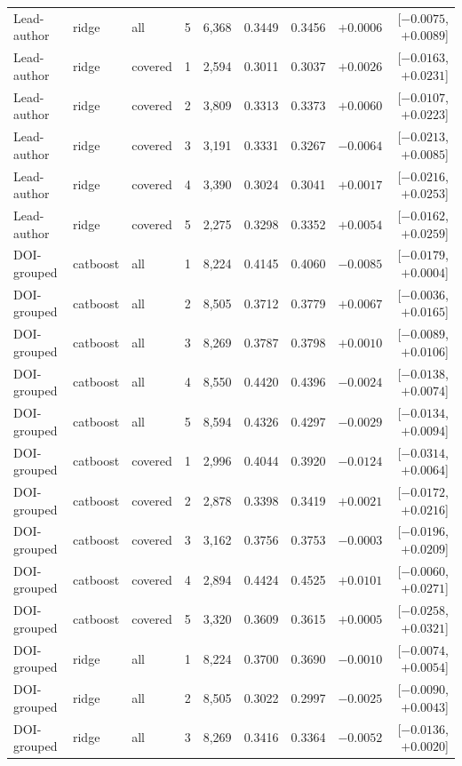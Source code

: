 \documentclass[10pt]{article}
\begin{document}
{\begin{longtable}{llllrrrrr}
Lead-author & ridge & all & 5 & 6,368 & 0.3449 & 0.3456 & $+0.0006$ & [$-0.0075$, $+0.0089$]\\
Lead-author & ridge & covered & 1 & 2,594 & 0.3011 & 0.3037 & $+0.0026$ & [$-0.0163$, $+0.0231$]\\
Lead-author & ridge & covered & 2 & 3,809 & 0.3313 & 0.3373 & $+0.0060$ & [$-0.0107$, $+0.0223$]\\
Lead-author & ridge & covered & 3 & 3,191 & 0.3331 & 0.3267 & $-0.0064$ & [$-0.0213$, $+0.0085$]\\
Lead-author & ridge & covered & 4 & 3,390 & 0.3024 & 0.3041 & $+0.0017$ & [$-0.0216$, $+0.0253$]\\
Lead-author & ridge & covered & 5 & 2,275 & 0.3298 & 0.3352 & $+0.0054$ & [$-0.0162$, $+0.0259$]\\
DOI-grouped & catboost & all & 1 & 8,224 & 0.4145 & 0.4060 & $-0.0085$ & [$-0.0179$, $+0.0004$]\\
DOI-grouped & catboost & all & 2 & 8,505 & 0.3712 & 0.3779 & $+0.0067$ & [$-0.0036$, $+0.0165$]\\
DOI-grouped & catboost & all & 3 & 8,269 & 0.3787 & 0.3798 & $+0.0010$ & [$-0.0089$, $+0.0106$]\\
DOI-grouped & catboost & all & 4 & 8,550 & 0.4420 & 0.4396 & $-0.0024$ & [$-0.0138$, $+0.0074$]\\
DOI-grouped & catboost & all & 5 & 8,594 & 0.4326 & 0.4297 & $-0.0029$ & [$-0.0134$, $+0.0094$]\\
DOI-grouped & catboost & covered & 1 & 2,996 & 0.4044 & 0.3920 & $-0.0124$ & [$-0.0314$, $+0.0064$]\\
DOI-grouped & catboost & covered & 2 & 2,878 & 0.3398 & 0.3419 & $+0.0021$ & [$-0.0172$, $+0.0216$]\\
DOI-grouped & catboost & covered & 3 & 3,162 & 0.3756 & 0.3753 & $-0.0003$ & [$-0.0196$, $+0.0209$]\\
DOI-grouped & catboost & covered & 4 & 2,894 & 0.4424 & 0.4525 & $+0.0101$ & [$-0.0060$, $+0.0271$]\\
DOI-grouped & catboost & covered & 5 & 3,320 & 0.3609 & 0.3615 & $+0.0005$ & [$-0.0258$, $+0.0321$]\\
DOI-grouped & ridge & all & 1 & 8,224 & 0.3700 & 0.3690 & $-0.0010$ & [$-0.0074$, $+0.0054$]\\
DOI-grouped & ridge & all & 2 & 8,505 & 0.3022 & 0.2997 & $-0.0025$ & [$-0.0090$, $+0.0043$]\\
DOI-grouped & ridge & all & 3 & 8,269 & 0.3416 & 0.3364 & $-0.0052$ & [$-0.0136$, $+0.0020$]\\

\end{longtable}}
\end{document}
